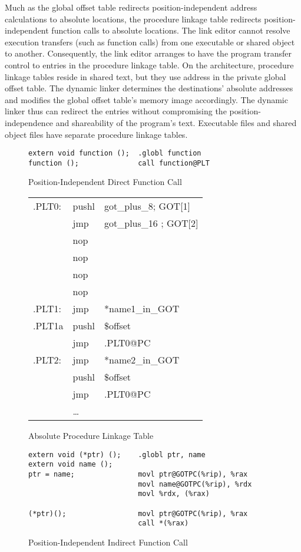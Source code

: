 Much as the global offset table redirects position-independent address
calculations to absolute locations, the procedure linkage table
redirects position-independent function calls to absolute locations.
The link editor cannot resolve execution transfers (such as function
calls) from one executable or shared object to another.  Consequently,
the link editor arranges to have the program transfer control to
entries in the procedure linkage table.  On the \xARCH architecture,
procedure linkage tables reside in shared text, but they use address
in the private global offset table.  The dynamic linker determines the
destinations' absolute addresses and modifies the global offset
table's memory image accordingly.  The dynamic linker thus can
redirect the entries without compromising the position-independence
and shareability of the program's text.  Executable files and shared
object files have separate procedure linkage tables.  



\begin{figure}[H]
\caption{Position-Independent Direct Function Call}
\begin{verbatim}
extern void function ();  .globl function
function ();              call function@PLT
\end{verbatim}
\end{figure}

\begin{figure}[H]
\caption{Absolute Procedure Linkage Table}
\begin{tabular}{lll}
.PLT0: & pushl & got\_plus\_8; GOT[1]\\
& jmp &got\_plus\_16 ; GOT[2] \\
& nop & \\
& nop & \\
& nop & \\
& nop & \\
.PLT1: & jmp & *name1\_in\_GOT\\
.PLT1a& pushl & \$offset \\
&jmp &.PLT0@PC \\
.PLT2: & jmp& *name2\_in\_GOT\\
&pushl & \$offset \\
& jmp & .PLT0@PC \\
&\dots\\
\end{tabular}
\end{figure}

\begin{figure}[H]
\caption{Position-Independent Indirect Function Call}
\begin{verbatim}
extern void (*ptr) ();    .globl ptr, name
extern void name ();
ptr = name;               movl ptr@GOTPC(%rip), %rax
                          movl name@GOTPC(%rip), %rdx
                          movl %rdx, (%rax)

(*ptr)();                 movl ptr@GOTPC(%rip), %rax
                          call *(%rax)
\end{verbatim}
\end{figure}

